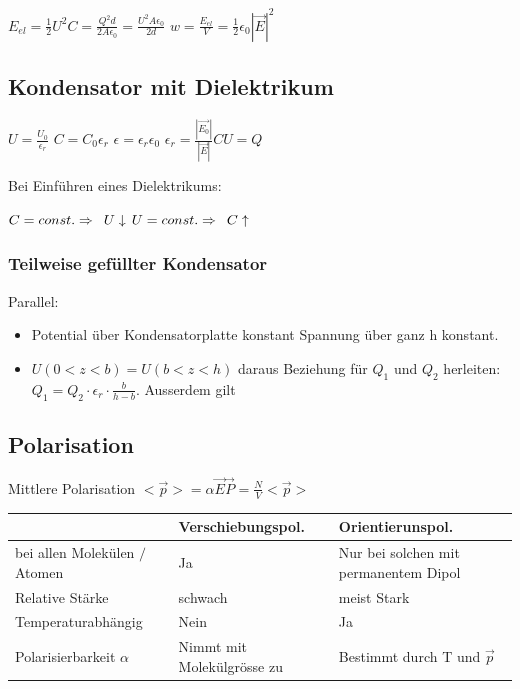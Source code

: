 \documentclass[10pt,a4paper]{scrartcl}
\begin{document}
\begin{multicols*}{3}
	$E_{el}=\frac{1}{2}U^2 C=\frac{Q^2 d}{2A\epsilon_0}=\frac{U^2 A \epsilon_0}{2d}$ \hfill$w=\frac{E_{el}}{V}=\frac{1}{2}\epsilon_0|\vec{E}|^2$ 
		
	\subsection*{Kondensator mit Dielektrikum}
	$U = \frac{U_0}{\epsilon_r}$ \hfill $C = C_0\epsilon_r$ \hfill $\epsilon = \epsilon_r\epsilon_0$ \hfill $\epsilon_r=\frac{|\vec{E_0}|}{|\vec{E}|}$\hfill$CU=Q$
	
	Bei Einführen eines Dielektrikums:
	
	$ C = const. \Rightarrow \hspace{5px} U \downarrow $ \hfill $U = const.\Rightarrow\hspace{5px} C \uparrow $

	\subsubsection*{Teilweise gefüllter Kondensator}
	
	
	Parallel:
	\begin{itemize}
	\compaq
	\item
	Potential über Kondensatorplatte konstant \dahe Spannung über ganz h konstant.
	\item
	$U(0<z<b)=U(b<z<h)$ \dahe daraus Beziehung für $Q_1$ und $Q_2$ herleiten: $Q_1=Q_2\cdot\epsilon_r\cdot\frac{b}{h-b}$. Ausserdem gilt 
	\end{itemize}
	
	\subsection{Polarisation}
	Mittlere Polarisation $<\vec{p}>=\alpha\vec{E}$\hfill$\vec{P}=\frac{N}{V}<\vec{p}>$
	
	\begin{tabulary}{\linewidth}{L|L|L}
	&Verschiebungspol. & Orientierunspol.\\
	\hline
	bei allen Molekülen $/$ Atomen & Ja & Nur bei solchen mit permanentem Dipol\\
	\hline
	Relative Stärke & schwach & meist Stark\\
	\hline
	Temperaturabhängig & Nein & Ja\\
	\hline
	Polarisierbarkeit $\alpha$ & Nimmt mit Molekülgrösse zu & Bestimmt durch T und $\vec{p}$\\
	\end{tabulary}
	

\end{multicols*}
\end{document}
